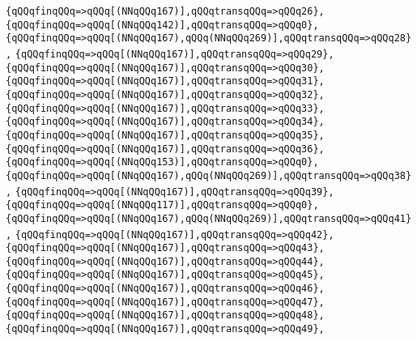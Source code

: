 \verb|{qQQqfinqQQq=>qQQq[(NNqQQq167)],qQQqtransqQQq=>qQQq26},|\newline
\verb|{qQQqfinqQQq=>qQQq[(NNqQQq142)],qQQqtransqQQq=>qQQq0},|\newline
\verb|{qQQqfinqQQq=>qQQq[(NNqQQq167),qQQq(NNqQQq269)],qQQqtransqQQq=>qQQq28},|\newline
\verb|{qQQqfinqQQq=>qQQq[(NNqQQq167)],qQQqtransqQQq=>qQQq29},|\newline
\verb|{qQQqfinqQQq=>qQQq[(NNqQQq167)],qQQqtransqQQq=>qQQq30},|\newline
\verb|{qQQqfinqQQq=>qQQq[(NNqQQq167)],qQQqtransqQQq=>qQQq31},|\newline
\verb|{qQQqfinqQQq=>qQQq[(NNqQQq167)],qQQqtransqQQq=>qQQq32},|\newline
\verb|{qQQqfinqQQq=>qQQq[(NNqQQq167)],qQQqtransqQQq=>qQQq33},|\newline
\verb|{qQQqfinqQQq=>qQQq[(NNqQQq167)],qQQqtransqQQq=>qQQq34},|\newline
\verb|{qQQqfinqQQq=>qQQq[(NNqQQq167)],qQQqtransqQQq=>qQQq35},|\newline
\verb|{qQQqfinqQQq=>qQQq[(NNqQQq167)],qQQqtransqQQq=>qQQq36},|\newline
\verb|{qQQqfinqQQq=>qQQq[(NNqQQq153)],qQQqtransqQQq=>qQQq0},|\newline
\verb|{qQQqfinqQQq=>qQQq[(NNqQQq167),qQQq(NNqQQq269)],qQQqtransqQQq=>qQQq38},|\newline
\verb|{qQQqfinqQQq=>qQQq[(NNqQQq167)],qQQqtransqQQq=>qQQq39},|\newline
\verb|{qQQqfinqQQq=>qQQq[(NNqQQq117)],qQQqtransqQQq=>qQQq0},|\newline
\verb|{qQQqfinqQQq=>qQQq[(NNqQQq167),qQQq(NNqQQq269)],qQQqtransqQQq=>qQQq41},|\newline
\verb|{qQQqfinqQQq=>qQQq[(NNqQQq167)],qQQqtransqQQq=>qQQq42},|\newline
\verb|{qQQqfinqQQq=>qQQq[(NNqQQq167)],qQQqtransqQQq=>qQQq43},|\newline
\verb|{qQQqfinqQQq=>qQQq[(NNqQQq167)],qQQqtransqQQq=>qQQq44},|\newline
\verb|{qQQqfinqQQq=>qQQq[(NNqQQq167)],qQQqtransqQQq=>qQQq45},|\newline
\verb|{qQQqfinqQQq=>qQQq[(NNqQQq167)],qQQqtransqQQq=>qQQq46},|\newline
\verb|{qQQqfinqQQq=>qQQq[(NNqQQq167)],qQQqtransqQQq=>qQQq47},|\newline
\verb|{qQQqfinqQQq=>qQQq[(NNqQQq167)],qQQqtransqQQq=>qQQq48},|\newline
\verb|{qQQqfinqQQq=>qQQq[(NNqQQq167)],qQQqtransqQQq=>qQQq49},|\newline
